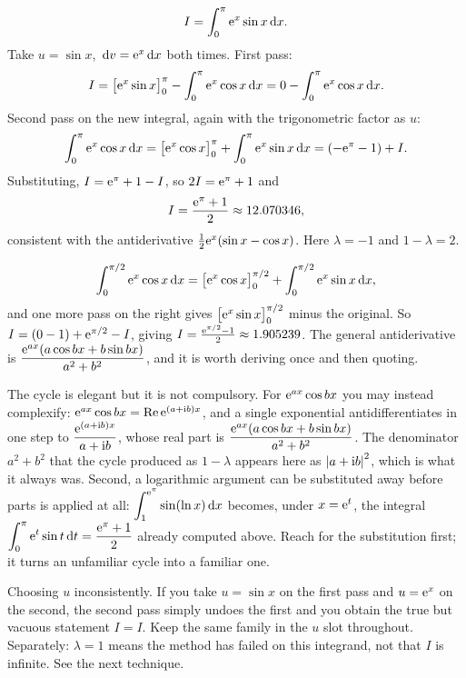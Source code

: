 \begin{worked}
\[I=\int_0^{\pi}\mathrm{e}^{x}\sin x\,\mathrm{d} x.\]
Take $u=\sin x$, $\,\mathrm{d} v=\mathrm{e}^{x}\,\mathrm{d} x$ both times. First pass:
\[I=\bigl[\mathrm{e}^{x}\sin x\bigr]_0^{\pi}-\int_0^{\pi}\mathrm{e}^{x}\cos x\,\mathrm{d} x=0-\int_0^{\pi}\mathrm{e}^{x}\cos x\,\mathrm{d} x.\]
Second pass on the new integral, again with the trigonometric factor as $u$:
\[\int_0^{\pi}\mathrm{e}^{x}\cos x\,\mathrm{d} x=\bigl[\mathrm{e}^{x}\cos x\bigr]_0^{\pi}+\int_0^{\pi}\mathrm{e}^{x}\sin x\,\mathrm{d} x=(-\mathrm{e}^{\pi}-1)+I.\]
Substituting, $I=\mathrm{e}^{\pi}+1-I$, so $2I=\mathrm{e}^{\pi}+1$ and
\[I=\frac{\mathrm{e}^{\pi}+1}{2}\approx12.070346,\]
consistent with the antiderivative $\tfrac12\mathrm{e}^{x}(\sin x-\cos x)$. Here $\lambda=-1$ and $1-\lambda=2$.
\end{worked}

\begin{worked}
\[\int_0^{\pi/2}\mathrm{e}^{x}\cos x\,\mathrm{d} x=\bigl[\mathrm{e}^{x}\cos x\bigr]_0^{\pi/2}+\int_0^{\pi/2}\mathrm{e}^{x}\sin x\,\mathrm{d} x,\]
and one more pass on the right gives $\bigl[\mathrm{e}^{x}\sin x\bigr]_0^{\pi/2}$ minus the original. So $I=(0-1)+\mathrm{e}^{\pi/2}-I$, giving $I=\tfrac{\mathrm{e}^{\pi/2}-1}{2}\approx1.905239$. The general antiderivative is $\dfrac{\mathrm{e}^{ax}(a\cos bx+b\sin bx)}{a^{2}+b^{2}}$, and it is worth deriving once and then quoting.
\end{worked}

\begin{keynote}
The cycle is elegant but it is not compulsory. For $\mathrm{e}^{ax}\cos bx$ you may instead complexify: $\mathrm{e}^{ax}\cos bx=\operatorname{Re}\mathrm{e}^{(a+\mathrm{i} b)x}$, and a single exponential antidifferentiates in one step to $\dfrac{\mathrm{e}^{(a+\mathrm{i} b)x}}{a+\mathrm{i} b}$, whose real part is $\dfrac{\mathrm{e}^{ax}(a\cos bx+b\sin bx)}{a^{2}+b^{2}}$. The denominator $a^{2}+b^{2}$ that the cycle produced as $1-\lambda$ appears here as $\left\lvert a+\mathrm{i} b\right\rvert^{2}$, which is what it always was. Second, a logarithmic argument can be substituted away before parts is applied at all: $\displaystyle\int_1^{\mathrm{e}^{\pi}}\sin(\ln x)\,\mathrm{d} x$ becomes, under $x=\mathrm{e}^{t}$, the integral $\displaystyle\int_0^{\pi}\mathrm{e}^{t}\sin t\,\mathrm{d} t=\frac{\mathrm{e}^{\pi}+1}{2}$ already computed above. Reach for the substitution first; it turns an unfamiliar cycle into a familiar one.
\end{keynote}

\begin{trap}
Choosing $u$ inconsistently. If you take $u=\sin x$ on the first pass and $u=\mathrm{e}^{x}$ on the second, the second pass simply undoes the first and you obtain the true but vacuous statement $I=I$. Keep the same family in the $u$ slot throughout. Separately: $\lambda=1$ means the method has failed on this integrand, not that $I$ is infinite. See the next technique.
\end{trap}

